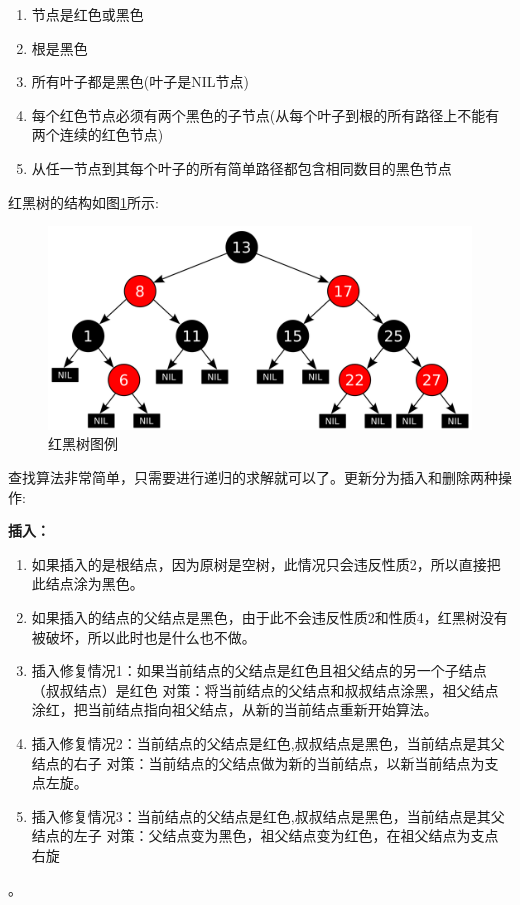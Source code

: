 \begin{enumerate}
    \item 节点是红色或黑色
    \item 根是黑色
    \item 所有叶子都是黑色(叶子是NIL节点)
    \item 每个红色节点必须有两个黑色的子节点(从每个叶子到根的所有路径上不能有两个连续的红色节点)
    \item 从任一节点到其每个叶子的所有简单路径都包含相同数目的黑色节点
\end{enumerate}

红黑树的结构如图\ref{fig:red-blacktreeexample}所示:
\begin{figure}[H]
    \centering
    \includegraphics[width=0.7\linewidth]{figures/Red-black_tree_example}
    \caption{红黑树图例}
    \label{fig:red-blacktreeexample}
\end{figure}

查找算法非常简单，只需要进行递归的求解就可以了。更新分为插入和删除两种操作:

\textbf{插入：}
\begin{enumerate}
    \item 如果插入的是根结点，因为原树是空树，此情况只会违反性质2，所以直接把此结点涂为黑色。
    \item 如果插入的结点的父结点是黑色，由于此不会违反性质2和性质4，红黑树没有被破坏，所以此时也是什么也不做。
    \item 插入修复情况1：如果当前结点的父结点是红色且祖父结点的另一个子结点（叔叔结点）是红色
    \subitem 对策：将当前结点的父结点和叔叔结点涂黑，祖父结点涂红，把当前结点指向祖父结点，从新的当前结点重新开始算法。
    \item 插入修复情况2：当前结点的父结点是红色,叔叔结点是黑色，当前结点是其父结点的右子
    \subitem 对策：当前结点的父结点做为新的当前结点，以新当前结点为支点左旋。
    \item 插入修复情况3：当前结点的父结点是红色,叔叔结点是黑色，当前结点是其父结点的左子
    \subitem 对策：父结点变为黑色，祖父结点变为红色，在祖父结点为支点右旋
\end{enumerate}。

